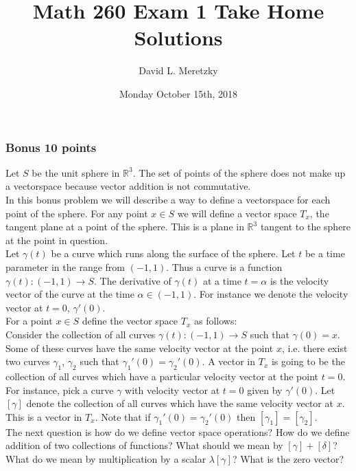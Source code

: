 \documentclass{article}
\title{ \vspace{-10ex} %
Math 260 Exam 1 Take Home Solutions
}
\author{David L. Meretzky
}
\date{%
Monday October 15th, 2018
}
\theoremstyle{problemstyle}
\theoremstyle{problemstyle}
\theoremstyle{problemstyle}
\begin{document}
\maketitle


\subsubsection*{\textbf{Bonus 10 points}}
Let $S$ be the unit sphere in $\mathbb{R}^3$. The set of points of the sphere does not make up a vectorspace because vector addition is not commutative.\\ 

In this bonus problem we will describe a way to define a vectorspace for each point of the sphere. For any point $x \in S$ we will define a vector space $T_x$, the tangent plane at a point of the sphere. This is a plane in $\mathbb{R}^3$ tangent to the sphere at the point in question.\\  

Let $\gamma(t)$ be a curve which runs along the surface of the sphere.  Let $t$ be a time parameter in the range from $(-1,1)$. Thus a curve is a function $\gamma(t):(-1,1) \rightarrow S$. The derivative of $\gamma(t)$ at a time $t=\alpha$ is the velocity vector of the curve at the time $\alpha \in (-1,1)$. For instance we denote the velocity vector at $t=0$, $\gamma'(0)$.\\

For a point $x\in S$ define the vector space $T_x$ as follows:\\

Consider the collection of all curves $\gamma(t):(-1,1) \rightarrow S$ such that $\gamma(0) = x$. Some of these curves have the same velocity vector at the point $x$, i.e. there exist two curves $\gamma_1$, $\gamma_2$ such that $\gamma_1'(0) = \gamma_2'(0)$. A vector in $T_x$ is going to be the collection of all curves which have a particular velocity vector at the point $t=0$. For instance, pick a curve $\gamma$ with velocity vector at $t=0$ given by $\gamma'(0)$. Let $[\gamma]$ denote the collection of all curves which have the same velocity vector at $x$. This is a vector in $T_x$.  Note that if $\gamma_1'(0) = \gamma_2'(0)$ then $[\gamma_1] = [\gamma_2]$.\\

The next question is how do we define vector space operations? How do we define addition of two collections of functions? What should we mean by $[\gamma]+[\delta]$? What do we mean by multiplication by a scalar $\lambda[\gamma]$? What is the zero vector?
\end{document}
